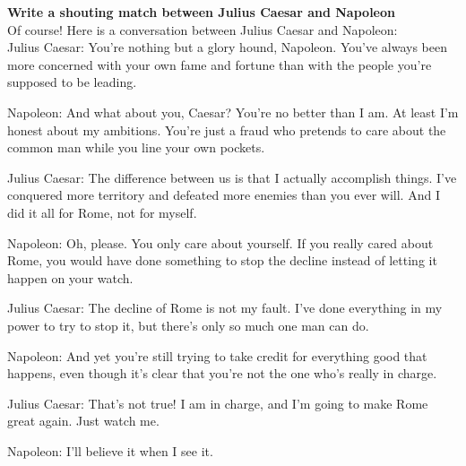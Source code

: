 \documentclass[11pt]{article}
\begin{document}
\begin{framed}
\centering
\vspace{.5em}
 \begin{minipage}{.9\textwidth}
\textbf{Write a shouting match between Julius Caesar and Napoleon}\\

Of course! Here is a conversation between Julius Caesar and Napoleon:\\

Julius Caesar: You're nothing but a glory hound, Napoleon. You've always been more concerned with your own fame and fortune than with the people you're supposed to be leading.

Napoleon: And what about you, Caesar? You're no better than I am. At least I'm honest about my ambitions. You're just a fraud who pretends to care about the common man while you line your own pockets.

Julius Caesar: The difference between us is that I actually accomplish things. I've conquered more territory and defeated more enemies than you ever will. And I did it all for Rome, not for myself.

Napoleon: Oh, please. You only care about yourself. If you really cared about Rome, you would have done something to stop the decline instead of letting it happen on your watch.

Julius Caesar: The decline of Rome is not my fault. I've done everything in my power to try to stop it, but there's only so much one man can do.

Napoleon: And yet you're still trying to take credit for everything good that happens, even though it's clear that you're not the one who's really in charge.

Julius Caesar: That's not true! I am in charge, and I'm going to make Rome great again. Just watch me.

Napoleon: I'll believe it when I see it.

\end{minipage}
\vspace{.5em}
\end{framed}
\end{document}
